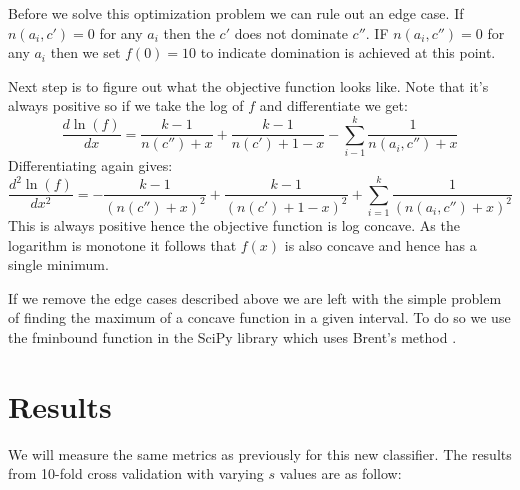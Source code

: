 Before we solve this optimization problem we can rule out an edge case.
If $n(a_i, c')=0$ for any $a_i$ then the $c'$ does not dominate $c''$.
IF $n(a_i, c'')=0$ for any $a_i$ then we set $f(0)=10$ to indicate domination is achieved at this point.

Next step is to figure out what the objective function looks like.
Note that it's always positive so if we take the log of $f$ and differentiate we get:
\begin{equation}
	\frac{d\ln(f)}{dx} = \frac{k-1}{n(c'')+x} + \frac{k-1}{n(c')+1-x} - \sum_{i-1}^k \frac{1}{n(a_i, c'') + x}
\end{equation}
Differentiating again gives:
\begin{equation}
	\frac{d^2\ln(f)}{dx^2} = -\frac{k-1}{(n(c'') + x)^2} + \frac{k-1}{(n(c')+1-x)^2} + \sum_{i=1}^k \frac{1}{(n(a_i, c'') + x)^2}
\end{equation}
This is always positive hence the objective function is log concave.
As the logarithm is monotone it follows that $f(x)$ is also concave and hence has a single minimum.

If we remove the edge cases described above we are left with the simple problem of finding the maximum of a concave function in a given interval.
To do so we use the fminbound function in the SciPy library which uses Brent's method \cite{fminbound}.


\section{Results}

We will measure the same metrics as previously for this new classifier.
The results from 10-fold cross validation with varying $s$ values are as follow:

